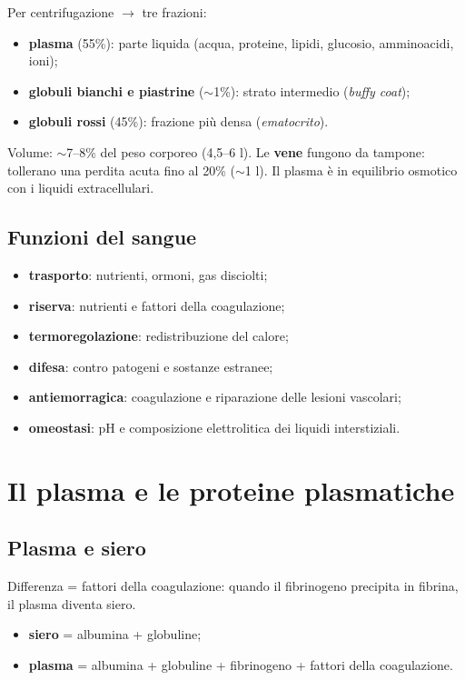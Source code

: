 Per centrifugazione $\rightarrow$ tre frazioni:
\begin{itemize}
  \item \textbf{plasma} (55\%): parte liquida (acqua, proteine, lipidi, glucosio, amminoacidi, ioni);
  \item \textbf{globuli bianchi e piastrine} ($\sim$1\%): strato intermedio (\textit{buffy coat});
  \item \textbf{globuli rossi} (45\%): frazione più densa (\textit{ematocrito}).
\end{itemize}
Volume: $\sim$7--8\% del peso corporeo (4,5--6 l). Le \textbf{vene} fungono da tampone: tollerano
una perdita acuta fino al 20\% ($\sim$1 l). Il plasma è in equilibrio osmotico con i liquidi
extracellulari.

\subsection{Funzioni del sangue}
\begin{itemize}
  \item \textbf{trasporto}: nutrienti, ormoni, gas disciolti;
  \item \textbf{riserva}: nutrienti e fattori della coagulazione;
  \item \textbf{termoregolazione}: redistribuzione del calore;
  \item \textbf{difesa}: contro patogeni e sostanze estranee;
  \item \textbf{antiemorragica}: coagulazione e riparazione delle lesioni vascolari;
  \item \textbf{omeostasi}: pH e composizione elettrolitica dei liquidi interstiziali.
\end{itemize}

\section{Il plasma e le proteine plasmatiche}

\subsection{Plasma e siero}
Differenza = fattori della coagulazione: quando il fibrinogeno precipita in fibrina, il plasma
diventa siero.
\begin{itemize}
  \item \textbf{siero} = albumina + globuline;
  \item \textbf{plasma} = albumina + globuline + fibrinogeno + fattori della coagulazione.
\end{itemize}

